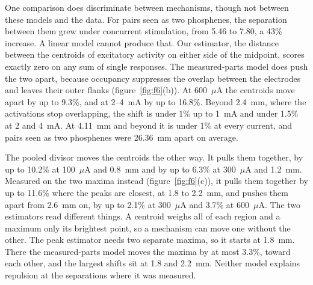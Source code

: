 \documentclass[10pt,twocolumn]{article}
\newcommand{\uA}{\ensuremath{\mu\text{A}}}
\begin{document}
One comparison does discriminate between mechanisms, though not between
these models and the data. For pairs seen as two phosphenes, the separation
between them grew under concurrent stimulation, from 5.46\textdegree{} to
7.80\textdegree, a 43\% increase. A linear model cannot produce that. Our
estimator, the distance between the centroids of excitatory activity on
either side of the midpoint, scores exactly zero on any sum of single
responses. The measured-parts model does push the two apart, because
occupancy suppresses the overlap between the electrodes and leaves their
outer flanks (figure~\ref{fig:f6}(b)). At 600~\uA{} the centroids move
apart by up to 9.3\%, and at 2--4~mA by up to 16.8\%. Beyond 2.4~mm,
where the activations stop overlapping, the shift is under 1\% up to 1~mA
and under 1.5\% at 2 and 4~mA. At 4.11~mm and beyond it is under 1\% at
every current, and pairs seen as two phosphenes were 26.36~mm apart on
average.

The pooled divisor moves the centroids the other way. It pulls them
together, by up to 10.2\% at 100~\uA{} and 0.8~mm and by up to 6.3\% at
300~\uA{} and 1.2~mm. Measured on the two maxima instead
(figure~\ref{fig:f6}(c)), it pulls them together by up to 11.6\% where the
peaks are closest, at 1.8 to 2.2~mm, and pushes them apart from 2.6~mm on,
by up to 2.1\% at 300~\uA{} and 3.7\% at 600~\uA. The two estimators read
different things. A centroid weighs all of each region and a maximum only
its brightest point, so a mechanism can move one without the other. The
peak estimator needs two separate maxima, so it starts at 1.8~mm. There the
measured-parts model moves the maxima by at most 3.3\%, toward each other,
and the largest shifts sit at 1.8 and 2.2~mm. Neither model explains
repulsion at the separations where it was measured.

\begin{table}[t]
\centering
\caption{Peak departure from superposition (\%) at the mean separations
  reported by \citet{bosking2022}, and the separation at which it decays to
  a tenth of its largest value. Pairs at 4.11~mm merged into one
  phosphene, pairs reported as one phosphene averaged 9.57~mm, pairs in
  which one phosphene went unreported 13.47~mm, and pairs seen as two
  phosphenes 26.36~mm. Measured-parts rows above 0.6~mA extrapolate
  recruitment far past its calibration. A 0 is zero to machine precision,
  and 0.0 a value that rounds to zero.}
\label{tab:t2}
\small
\setlength{\tabcolsep}{2.6pt}

\end{table}
\end{document}
